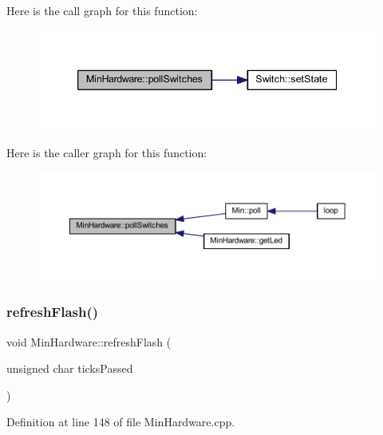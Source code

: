 Here is the call graph for this function\+:
\nopagebreak
\begin{figure}[H]
\begin{center}
\leavevmode
\includegraphics[width=339pt]{class_min_hardware_a135650ade19c661a9e20f0a410722a10_cgraph}
\end{center}
\end{figure}
Here is the caller graph for this function\+:
\nopagebreak
\begin{figure}[H]
\begin{center}
\leavevmode
\includegraphics[width=350pt]{class_min_hardware_a135650ade19c661a9e20f0a410722a10_icgraph}
\end{center}
\end{figure}
\mbox{\label{class_min_hardware_a22017d021942bf72850a338b1522d5c2}} 
\subsubsection{\texorpdfstring{refresh\+Flash()}{refreshFlash()}}
{\footnotesize\ttfamily void Min\+Hardware\+::refresh\+Flash (\begin{DoxyParamCaption}\item[{unsigned char}]{ticks\+Passed }\end{DoxyParamCaption})}



Definition at line 148 of file Min\+Hardware.\+cpp.

